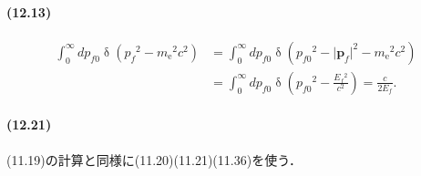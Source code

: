 \paragraph{(12.13)}
\begin{align*}
  \int_0^\infty dp_{f0}\operatorname{\delta}(p_f{}^2-m_\text{e}{}^2c^2) & = \int_0^\infty dp_{f0}\operatorname{\delta}(p_{f0}{}^2-\lvert\boldsymbol{p}_f\rvert^2-m_\text{e}{}^2c^2)\\
  & = \int_0^\infty dp_{f0}\operatorname{\delta}\left(p_{f0}{}^2-\frac{E_f{}^2}{c^2}\right) = \frac{c}{2E_f}.
\end{align*}

\paragraph{(12.21)}
(11.19)の計算と同様に(11.20)(11.21)(11.36)を使う．

